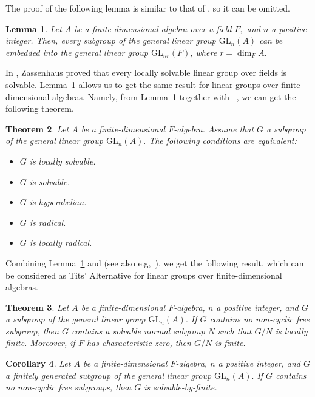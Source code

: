 \documentclass{amsart}
\newtheorem{theorem}{Theorem}[section]
\newtheorem{lemma}[theorem]{Lemma}
\newtheorem{corollary}[theorem]{Corollary}
\theoremstyle{definition}
\begin{document}
The proof of the following lemma is similar to that of \cite[Lemma 4.1]{Pa_ChuaHai_2026}, so it can be omitted. 
\begin{lemma}\label{lem:6.1} Let $A$ be a finite-dimensional algebra over a field $F,$ and $n$ a positive integer. Then, every subgroup of the general linear group $\mathrm{GL}_n(A)$ can be embedded into the general linear group $\mathrm{GL}_{nr}(F)$, where $r=\dim_FA.$
\end{lemma}
In \cite{Zassenhaus_1938}, Zassenhaus proved that every locally solvable linear group over fields is solvable. Lemma~\ref{lem:6.1} allows us to get the same result for linear groups over finite-dimensional algebras. Namely, from Lemma~\ref{lem:6.1} together with ~\cite[Corollary 1.4.9]{Bo_Dixon_2017}, we can get the following theorem. 

\begin{theorem}\label{th:6.2} Let $A$ be a finite-dimensional $F$-algebra. Assume that $G$ a subgroup of the general linear group $\mathrm{GL}_n(A).$ The following conditions are equivalent:
	\begin{itemize}
		\item [(1)] $G$ is locally solvable.
		\item [(2)] $G$ is solvable.
		\item [(3)] $G$ is hyperabelian.
		\item [(4)] $G$ is radical.
		\item [(5)] $G$ is locally radical.
	\end{itemize} 
\end{theorem}
Combining Lemma~\ref{lem:6.1} and \cite[Theorems 1, 2]{Pa_Tits_1972} (see also e.g,~\cite[Theorem 1.4.3]{Bo_Dixon_2017}), we get the following result, which can be considered as Tits' Alternative for linear groups over finite-dimensional algebras.
\begin{theorem}\label{th:6.3} Let $A$ be a finite-dimensional $F$-algebra, $n$ a positive integer, and $G$ a subgroup of the general linear group $\mathrm{GL}_n(A).$ If $G$ contains no non-cyclic free subgroup, then $G$ contains a solvable normal subgroup $N$ such that $G/N$ is locally finite. Moreover, if $F$ has characteristic zero, then $G/N$ is finite.
\end{theorem}
\begin{corollary}\label{cor:6.4} Let $A$ be a finite-dimensional $F$-algebra, $n$ a positive integer, and $G$ a finitely generated subgroup of the general linear group $\mathrm{GL}_n(A).$ If $G$ contains no non-cyclic free subgroups, then $G$ is solvable-by-finite.
\end{corollary}
\end{document}
